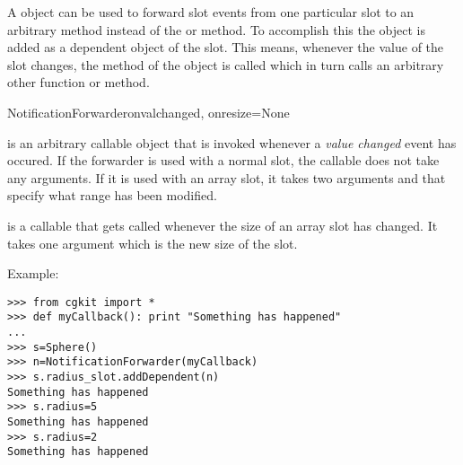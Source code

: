 A  object can be used to forward slot
events from one particular slot to an arbitrary method instead of
the  or  method.
To accomplish this the  object is
added as a dependent object of the slot. This means, whenever
the value of the slot changes, the  method
of the  object is called which in turn
calls an arbitrary other function or method.

\begin{classdesc}{NotificationForwarder}{onvalchanged, onresize=None}

 is an arbitrary callable object that is invoked whenever a
{\em value changed} event has occured. If the forwarder is used with
a normal slot, the callable does not take any arguments. If it is used
with an array slot, it takes two arguments  and  that
specify what range has been modified.

 is a callable that gets called whenever the size of an
array slot has changed. It takes one argument which is the new size of the
slot.
\end{classdesc}

Example:

\begin{verbatim}
>>> from cgkit import *
>>> def myCallback(): print "Something has happened"
...
>>> s=Sphere()
>>> n=NotificationForwarder(myCallback)
>>> s.radius_slot.addDependent(n)
Something has happened
>>> s.radius=5
Something has happened
>>> s.radius=2
Something has happened  
\end{verbatim}
